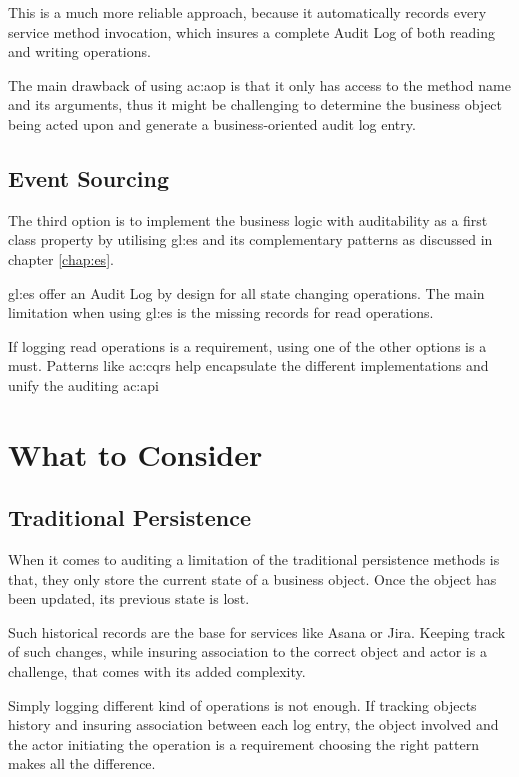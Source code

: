 This is a much more reliable approach, because it automatically records every service method invocation, which insures a complete Audit Log of both reading and writing operations.

The main drawback of using \gls{ac:aop} is that it only has access to the method name and its arguments, thus it might be challenging to determine the business object being acted upon and generate a business-oriented audit log entry.

\subsection{Event Sourcing}\label{sec:saes}

The third option is to implement the business logic with auditability as a first class property by utilising \gls{gl:es} and its complementary patterns as discussed in chapter \ref{chap:es}. 

\gls{gl:es} offer an Audit Log by design for all state changing operations. The main limitation when using \gls{gl:es} is the missing records for read operations.

If logging read operations is a requirement, using one of the other options is a must. Patterns like \gls{ac:cqrs} help encapsulate the different implementations and unify the auditing \gls{ac:api}

\section{What to Consider}

\subsection{Traditional Persistence}

When it comes to auditing a limitation of the traditional persistence methods is that, they only store the current state of a business object. Once the object has been updated, its previous state is lost. 

Such historical records are the base for services like Asana or Jira. Keeping track of such changes, while insuring association to the correct object and actor is a challenge, that comes with its added complexity.

Simply logging different kind of operations is not enough. If tracking objects history and insuring association between each log entry, the object involved and the actor initiating the operation is a requirement choosing the right pattern makes all the difference.

